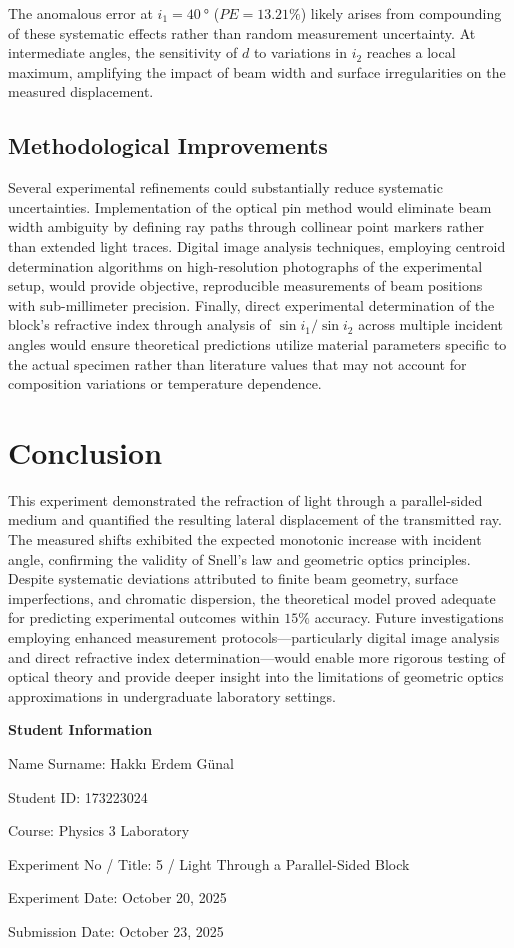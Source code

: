 \documentclass[12pt, a4paper]{article}
\begin{document}
The anomalous error at $i_1 = \SI{40}{\degree}$ ($PE = 13.21\%$) likely arises from compounding of these systematic effects rather than random measurement uncertainty. At intermediate angles, the sensitivity of $d$ to variations in $i_2$ reaches a local maximum, amplifying the impact of beam width and surface irregularities on the measured displacement.

\subsection{Methodological Improvements}

Several experimental refinements could substantially reduce systematic uncertainties. Implementation of the optical pin method would eliminate beam width ambiguity by defining ray paths through collinear point markers rather than extended light traces. Digital image analysis techniques, employing centroid determination algorithms on high-resolution photographs of the experimental setup, would provide objective, reproducible measurements of beam positions with sub-millimeter precision. Finally, direct experimental determination of the block's refractive index through analysis of $\sin i_1 / \sin i_2$ across multiple incident angles would ensure theoretical predictions utilize material parameters specific to the actual specimen rather than literature values that may not account for composition variations or temperature dependence.

\section{Conclusion}

This experiment demonstrated the refraction of light through a parallel-sided medium and quantified the resulting lateral displacement of the transmitted ray. The measured shifts exhibited the expected monotonic increase with incident angle, confirming the validity of Snell's law and geometric optics principles. Despite systematic deviations attributed to finite beam geometry, surface imperfections, and chromatic dispersion, the theoretical model proved adequate for predicting experimental outcomes within $15\%$ accuracy. Future investigations employing enhanced measurement protocols—particularly digital image analysis and direct refractive index determination—would enable more rigorous testing of optical theory and provide deeper insight into the limitations of geometric optics approximations in undergraduate laboratory settings.

\newpage

\textbf{Student Information}

Name Surname: Hakkı Erdem Günal

Student ID: 173223024

Course: Physics 3 Laboratory

Experiment No / Title: 5 / Light Through a Parallel-Sided Block

Experiment Date: October 20, 2025

Submission Date: October 23, 2025
\end{document}
